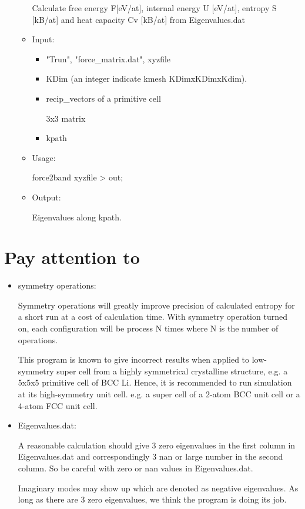 \documentclass[11pt]{article}
\begin{document}
\begin{itemize}
\begin{itemize}
Calculate free energy F[eV/at], internal energy U [eV/at], entropy S [kB/at] 
and heat capacity Cv [kB/at] from Eigenvalues.dat

\item Input: 

\begin{itemize}
\item "Trun", "force\_matrix.dat", xyzfile

\item KDim (an integer indicate kmesh KDimxKDimxKdim).

\item recip\_vectors of a primitive cell

3x3 matrix

\item kpath
\end{itemize}

\item Usage: 

force2band xyzfile > out;

\item Output: 

Eigenvalues along kpath.
\end{itemize}
\end{itemize}

\section{Pay attention to}
\label{sec:org8888f66}

\begin{itemize}
\item symmetry operations:

Symmetry operations will greatly improve precision of calculated entropy
for a short run at a cost of calculation time. With symmetry operation
turned on, each configuration will be process N times where N is the number
of operations.

This program is known to give incorrect results when applied to low-symmetry super
cell from a highly symmetrical crystalline structure, e.g. a 5x5x5 primitive
cell of BCC Li. Hence, it is recommended to run simulation at its
high-symmetry unit cell. e.g. a super cell of a 2-atom BCC unit cell or a 4-atom FCC
unit cell.

\item Eigenvalues.dat:

A reasonable calculation should give 3 zero eigenvalues in the first column
in Eigenvalues.dat and correspondingly 3 nan or large number in the second
column. So be careful with zero or nan values in Eigenvalues.dat.

Imaginary modes may show up which are denoted as negative eigenvalues. As
long as there are 3 zero eigenvalues, we think the program is doing its job.
\end{itemize}
\end{document}
